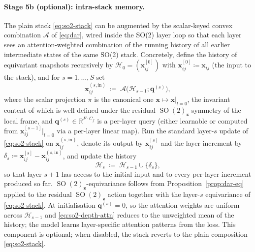 \documentclass[11pt,a4paper]{article}
\DeclareMathOperator{\SO}{SO}
\newcommand{\R}{\mathbb{R}}
\newcommand{\bx}{\bm{x}}
\newcommand{\bz}{\bm{z}}
\theoremstyle{plain}
\theoremstyle{definition}
\theoremstyle{remark}
\begin{document}
    \paragraph{Stage 5b (optional): intra-stack memory.}
    The plain stack \eqref{eq:so2-stack} can be augmented by the scalar-keyed
    convex combination $\mathcal{A}$ of \eqref{eq:dar}, wired inside the SO(2)
    layer loop so that each layer sees an attention-weighted combination of the
    running history of all earlier intermediate states of the same SO(2) stack.
    Concretely, define the history of equivariant snapshots recursively by
$\mathcal{H}_0=(\bx_{ij}^{[0]})$ with $\bx_{ij}^{[0]}\coloneqq\bx_{ij}$ (the
    input to the stack), and for $s=1,\dots,S$ set
    \begin{equation}\label{eq:so2-depth-attn}
        \bx_{ij}^{(s,\mathrm{in})}\;\coloneqq\;\mathcal{A}\!\bigl(\mathcal{H}_{s-1};\bm{q}^{(s)}\bigr),
    \end{equation}
    where the scalar projection $\pi$ is the canonical one $\bx\mapsto\bx|_{l=0}$, the invariant content of which is well-defined under the residual $\SO(2)_{\bz}$ symmetry of the local frame, and $\bm{q}^{(s)}\in\R^{F\cdot C_f}$ is a per-layer query (either learnable or computed from $\bx_{ij}^{[s-1]}|_{l=0}$ via a per-layer linear map).
    Run the standard layer-$s$ update of \eqref{eq:so2-stack} on $\bx_{ij}^{(s,\mathrm{in})}$, denote its output by $\bx_{ij}^{[s]}$ and the layer increment by $\delta_s\coloneqq\bx_{ij}^{[s]}-\bx_{ij}^{(s,\mathrm{in})}$, and update the history
    \begin{equation}\label{eq:so2-history}
        \mathcal{H}_s\;\coloneqq\;\mathcal{H}_{s-1}\cup\{\delta_s\},
    \end{equation}
    so that layer $s+1$ has access to the initial input and to every per-layer increment produced so far.
$\SO(2)_{\bz}$-equivariance follows from Proposition~\ref{prop:dar-eq} applied to the residual $\SO(2)_{\bz}$ action together with the layer-$s$ equivariance of \eqref{eq:so2-stack}.
    At initialisation $\bm{q}^{(s)}=0$, so the attention weights are uniform across $\mathcal{H}_{s-1}$ and \eqref{eq:so2-depth-attn} reduces to the unweighted mean of the history; the model learns layer-specific attention patterns from the loss.
    This component is optional; when disabled, the stack reverts to the plain composition \eqref{eq:so2-stack}.
\end{document}
